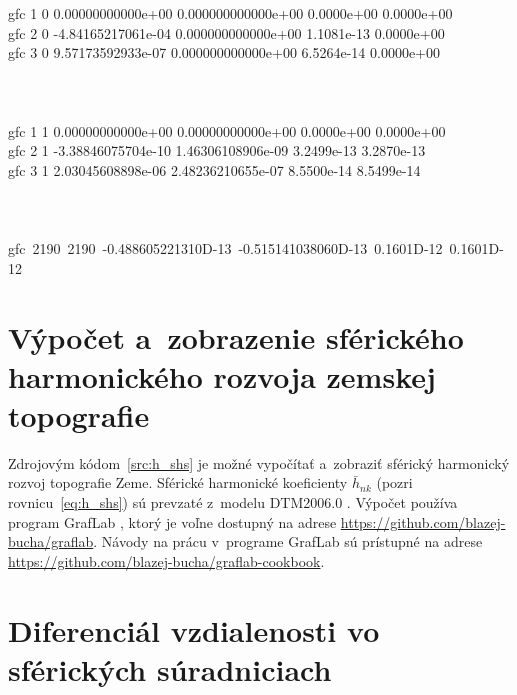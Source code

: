 \documentclass[a4paper, 12pt]{book}
\begin{document}
{\noindent gfc    1    0  \phantom{-}0.00000000000e+00 0.000000000000e+00 0.0000e+00 0.0000e+00\\
\noindent gfc    2    0 -4.84165217061e-04 0.000000000000e+00 1.1081e-13 0.0000e+00\\
\noindent gfc    3    0  \phantom{-}9.57173592933e-07 0.000000000000e+00 6.5264e-14 0.0000e+00\\
\\
\noindent [...]
\\
\\
\noindent gfc    1    1 \phantom{-}0.00000000000e+00 0.00000000000e+00 0.0000e+00 0.0000e+00\\
\noindent gfc    2    1 -3.38846075704e-10  1.46306108906e-09 3.2499e-13 3.2870e-13\\
\noindent gfc    3    1 \phantom{-}2.03045608898e-06  2.48236210655e-07 
8.5500e-14 8.5499e-14\\
\\
\noindent [...]
\\
\\
\noindent \mbox{gfc 2190 2190 -0.488605221310D-13 -0.515141038060D-13 0.1601D-12 0.1601D-12}
}

\normalsize





\chapter{Výpočet a~zobrazenie sférického harmonického rozvoja zemskej
topografie}
\label{app:shs_topography}

Zdrojovým kódom~\ref{src:h_shs} je možné vypočítať a~zobraziť sférický 
harmonický rozvoj topografie Zeme.  Sférické harmonické koeficienty 
$\bar{h}_{nk}$ (pozri rovnicu~\ref{eq:h_shs}) sú prevzaté z~modelu DTM2006.0 
\parencite{DTM2006}.  Výpočet používa program GrafLab \parencite{GrafLab}, 
ktorý je voľne dostupný na adrese 
\url{https://github.com/blazej-bucha/graflab}.  Návody na prácu v~programe 
GrafLab sú prístupné na adrese 
\url{https://github.com/blazej-bucha/graflab-cookbook}.








\chapter{Diferenciál vzdialenosti vo sférických súradniciach}
\label{app:differential_of_line_element_in_sph_coords}
\end{document}
